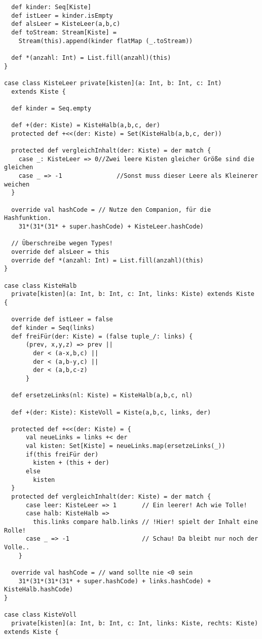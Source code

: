 \begin{lstlisting}
  def kinder: Seq[Kiste]
  def istLeer = kinder.isEmpty
  def alsLeer = KisteLeer(a,b,c)
  def toStream: Stream[Kiste] =
    Stream(this).append(kinder flatMap (_.toStream))

  def *(anzahl: Int) = List.fill(anzahl)(this)
}

case class KisteLeer private[kisten](a: Int, b: Int, c: Int)
  extends Kiste {

  def kinder = Seq.empty

  def +(der: Kiste) = KisteHalb(a,b,c, der)
  protected def +<<(der: Kiste) = Set(KisteHalb(a,b,c, der))

  protected def vergleichInhalt(der: Kiste) = der match {
    case _: KisteLeer => 0//Zwei leere Kisten gleicher Größe sind die gleichen
    case _ => -1               //Sonst muss dieser Leere als Kleinerer weichen
  }

  override val hashCode = // Nutze den Companion, für die Hashfunktion.
    31*(31*(31* + super.hashCode) + KisteLeer.hashCode)

  // Überschreibe wegen Types!
  override def alsLeer = this
  override def *(anzahl: Int) = List.fill(anzahl)(this)
}

case class KisteHalb
  private[kisten](a: Int, b: Int, c: Int, links: Kiste) extends Kiste {

  override def istLeer = false
  def kinder = Seq(links)
  def freiFür(der: Kiste) = (false tuple_/: links) {
      (prev, x,y,z) => prev ||
        der < (a-x,b,c) ||
        der < (a,b-y,c) ||
        der < (a,b,c-z)
      }

  def ersetzeLinks(nl: Kiste) = KisteHalb(a,b,c, nl)

  def +(der: Kiste): KisteVoll = Kiste(a,b,c, links, der)

  protected def +<<(der: Kiste) = {
      val neueLinks = links +< der
      val kisten: Set[Kiste] = neueLinks.map(ersetzeLinks(_))
      if(this freiFür der)
        kisten + (this + der)
      else
        kisten
  }
  protected def vergleichInhalt(der: Kiste) = der match {
      case leer: KisteLeer => 1       // Ein leerer! Ach wie Tolle!
      case halb: KisteHalb =>
        this.links compare halb.links // !Hier! spielt der Inhalt eine Rolle!
      case _ => -1                    // Schau! Da bleibt nur noch der Volle..
    }

  override val hashCode = // wand sollte nie <0 sein
    31*(31*(31*(31* + super.hashCode) + links.hashCode) + KisteHalb.hashCode)
}

case class KisteVoll
  private[kisten](a: Int, b: Int, c: Int, links: Kiste, rechts: Kiste) extends Kiste {


\end{lstlisting}
